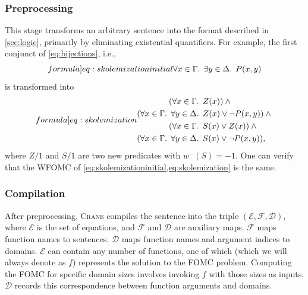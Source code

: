 \documentclass[a4paper,UKenglish,cleveref,autoref,thm-restate]{lipics-v2021}
\begin{document}
\subsubsection{Preprocessing}\label{sec:preprocessing}

This stage transforms an arbitrary sentence into the format described in
\cref{sec:logic}, primarily by eliminating existential quantifiers. For example,
the first conjunct of \cref{eq:bijections}, i.e.,
\begin{equation}\label[formula]{eq:skolemizationinitial}
  \forall x \in \Gamma\text{. }\exists y \in \Delta\text{. } P(x, y)
\end{equation}
is transformed into
\begin{equation}\label[formula]{eq:skolemization}
  \begin{aligned}
    (\forall x \in \Gamma\text{. } &Z(x))\land{}\\
    (\forall x \in \Gamma\text{. } \forall y \in \Delta\text{. } &Z(x) \lor \neg P(x, y))\land{}\\
    (\forall x \in \Gamma\text{. } &S(x) \lor Z(x))\land{}\\
    (\forall x \in \Gamma\text{. } \forall y \in \Delta\text{. } &S(x) \lor \neg P(x, y)),
  \end{aligned}
\end{equation}
where $Z/1$ and $S/1$ are two new predicates with $w^{-}(S) = -1$. One can
verify that the WFOMC of \cref{eq:skolemizationinitial,eq:skolemization} is the
same.

\subsubsection{Compilation}\label{sec:compilation}

After preprocessing, \textsc{Crane} compiles the sentence into the triple
$(\mathcal{E}, \mathcal{F}, \mathcal{D})$, where $\mathcal{E}$ is the set of
equations, and $\mathcal{F}$ and $\mathcal{D}$ are auxiliary maps. $\mathcal{F}$
maps function names to sentences. $\mathcal{D}$ maps function names and argument
indices to domains. $\mathcal{E}$ can contain any number of functions, one of
which (which we will always denote as $f$) represents the solution to the FOMC
problem. Computing the FOMC for specific domain sizes involves invoking $f$ with
those sizes as inputs. $\mathcal{D}$ records this correspondence between
function arguments and domains.
\end{document}
